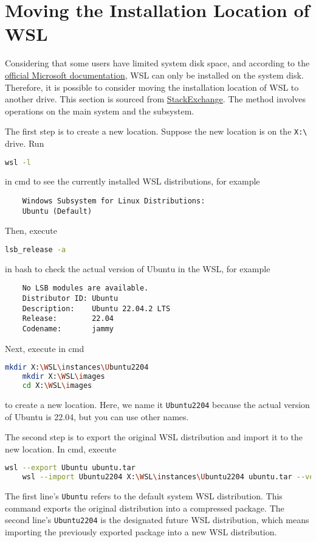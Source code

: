 \documentclass{report}
\begin{document}
\section{Moving the Installation Location of WSL}

Considering that some users have limited system disk space, and according to the \href{https://learn.microsoft.com/zh-cn/windows/wsl/troubleshooting?source=recommendations#installation-issues}{official Microsoft documentation}, WSL can only be installed on the system disk. Therefore, it is possible to consider moving the installation location of WSL to another drive. This section is sourced from \href{https://superuser.com/questions/1701175/installing-ubuntu-on-mnt-d-with-wsl}{StackExchange}. The method involves operations on the main system and the subsystem.

The first step is to create a new location. Suppose the new location is on the \texttt{X:\textbackslash} drive. Run
\begin{lstlisting}[language=bash]
	wsl -l
\end{lstlisting}
in \textsf{cmd} to see the currently installed WSL distributions, for example
\begin{lstlisting}
	Windows Subsystem for Linux Distributions:
	Ubuntu (Default)
\end{lstlisting}
Then, execute
\begin{lstlisting}[language=bash]
	lsb_release -a
\end{lstlisting}
in \textsf{bash} to check the actual version of Ubuntu in the WSL, for example
\begin{lstlisting}
	No LSB modules are available.
	Distributor ID: Ubuntu
	Description:    Ubuntu 22.04.2 LTS
	Release:        22.04
	Codename:       jammy
\end{lstlisting}
Next, execute in \textsf{cmd}
\begin{lstlisting}[language=bash]
	mkdir X:\WSL\instances\Ubuntu2204
	mkdir X:\WSL\images
	cd X:\WSL\images
\end{lstlisting}
to create a new location. Here, we name it \texttt{Ubuntu2204} because the actual version of Ubuntu is 22.04, but you can use other names.

The second step is to export the original WSL distribution and import it to the new location. In \textsf{cmd}, execute
\begin{lstlisting}[language=bash]
	wsl --export Ubuntu ubuntu.tar
	wsl --import Ubuntu2204 X:\WSL\instances\Ubuntu2204 ubuntu.tar --version 2
\end{lstlisting}
The first line's \texttt{Ubuntu} refers to the default system WSL distribution. This command exports the original distribution into a compressed package. The second line's \texttt{Ubuntu2204} is the designated future WSL distribution, which means importing the previously exported package into a new WSL distribution.
\end{document}
